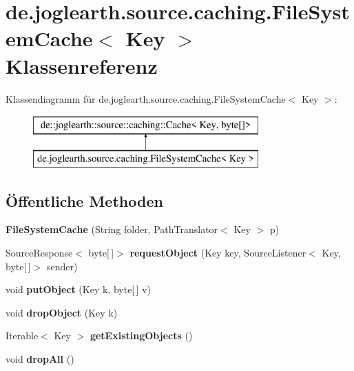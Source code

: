 \section{de.\-joglearth.\-source.\-caching.\-File\-System\-Cache$<$ Key $>$ Klassenreferenz}
\label{classde_1_1joglearth_1_1source_1_1caching_1_1_file_system_cache_3_01_key_01_4}
Klassendiagramm für de.\-joglearth.\-source.\-caching.\-File\-System\-Cache$<$ Key $>$\-:\begin{figure}[H]
\begin{center}
\leavevmode
\includegraphics[height=2.000000cm]{classde_1_1joglearth_1_1source_1_1caching_1_1_file_system_cache_3_01_key_01_4}
\end{center}
\end{figure}
\subsection*{Öffentliche Methoden}
\begin{DoxyCompactItemize}
\item 
{\bfseries File\-System\-Cache} (String folder, Path\-Translator$<$ Key $>$ p)\label{classde_1_1joglearth_1_1source_1_1caching_1_1_file_system_cache_3_01_key_01_4_aa15baef0f6d76f03f3b24a2b26217251}

\item 
Source\-Response$<$ byte[$\,$]$>$ {\bfseries request\-Object} (Key key, Source\-Listener$<$ Key, byte[$\,$]$>$ sender)\label{classde_1_1joglearth_1_1source_1_1caching_1_1_file_system_cache_3_01_key_01_4_ae40d9dd9583027c14e4468e183cf48da}

\item 
void {\bfseries put\-Object} (Key k, byte[$\,$] v)\label{classde_1_1joglearth_1_1source_1_1caching_1_1_file_system_cache_3_01_key_01_4_a0dcec50e30bb7f6356c7bf56ed386428}

\item 
void {\bfseries drop\-Object} (Key k)\label{classde_1_1joglearth_1_1source_1_1caching_1_1_file_system_cache_3_01_key_01_4_ae118a62fab9e478561d9a5ec7077901d}

\item 
Iterable$<$ Key $>$ {\bfseries get\-Existing\-Objects} ()\label{classde_1_1joglearth_1_1source_1_1caching_1_1_file_system_cache_3_01_key_01_4_a3b91ae313313eb6306e7af7997ab3dda}

\item 
void {\bfseries drop\-All} ()\label{classde_1_1joglearth_1_1source_1_1caching_1_1_file_system_cache_3_01_key_01_4_a433d8c26ced086c0cda87ebd1a072765}

\end{DoxyCompactItemize}
